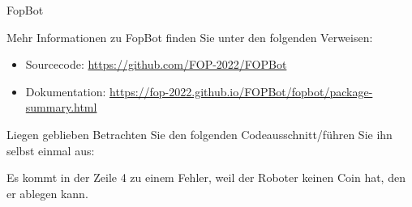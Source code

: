 \documentclass{../tuda-exercise}
\begin{document}
\begin{task}[credit=\stars{0}{3}]{FopBot}
\begin{solution}
\begin{note}[title=Information:]
        Mehr Informationen zu FopBot finden Sie unter den folgenden Verweisen:

        \begin{itemize}
          \item Sourcecode: \url{https://github.com/FOP-2022/FOPBot}
          \item Dokumentation: \url{https://fop-2022.github.io/FOPBot/fopbot/package-summary.html}
        \end{itemize}
      \end{note}
    \end{solution}
  \end{task}

  \clearpagesolution

  \begin{task}[credit=\stars{0}{3}]{Liegen geblieben}
    Betrachten Sie den folgenden Codeausschnitt/führen Sie ihn selbst einmal aus:

    

    \begin{solution}
      Es kommt in der Zeile 4 zu einem Fehler, weil der Roboter keinen Coin hat, den er ablegen
      kann.
    \end{solution}
  \end{task}

  \clearpagenosolution
\end{document}
